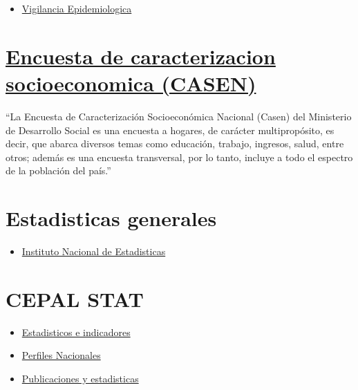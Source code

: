 \documentclass[]{book}
\providecommand{\tightlist}{%
  \setlength{\itemsep}{0pt}\setlength{\parskip}{0pt}}
\begin{document}
\begin{itemize}
\tightlist
\item
  \href{http://epi.minsal.cl/}{Vigilancia Epidemiologica}
\end{itemize}

\hypertarget{encuesta-de-caracterizacion-socioeconomica-casen}{%
\section{\texorpdfstring{\href{http://observatorio.ministeriodesarrollosocial.gob.cl/casen-multidimensional/casen/casen_2017.php}{Encuesta de caracterizacion socioeconomica (CASEN)}}{Encuesta de caracterizacion socioeconomica (CASEN)}}\label{encuesta-de-caracterizacion-socioeconomica-casen}}

``La Encuesta de Caracterización Socioeconómica Nacional (Casen) del Ministerio de Desarrollo Social es una encuesta a hogares, de carácter multipropósito, es decir, que abarca diversos temas como educación, trabajo, ingresos, salud, entre otros; además es una encuesta transversal, por lo tanto, incluye a todo el espectro de la población del país.''

\hypertarget{estadisticas-generales}{%
\section{Estadisticas generales}\label{estadisticas-generales}}

\begin{itemize}
\tightlist
\item
  \href{www.ine.cl}{Instituto Nacional de Estadisticas}
\end{itemize}

\hypertarget{cepal-stat}{%
\section{CEPAL STAT}\label{cepal-stat}}

\begin{itemize}
\tightlist
\item
  \href{http://estadisticas.cepal.org/cepalstat/WEB_CEPALSTAT/estadisticasIndicadores.asp}{Estadisticos e indicadores}
\item
  \href{http://estadisticas.cepal.org/cepalstat/WEB_CEPALSTAT/estadisticasIndicadores.asp}{Perfiles Nacionales}
\item
  \href{http://estadisticas.cepal.org/cepalstat/WEB_CEPALSTAT/PublicacionesEstadisticas.asp}{Publicaciones y estadisticas}
\end{itemize}
\end{document}
